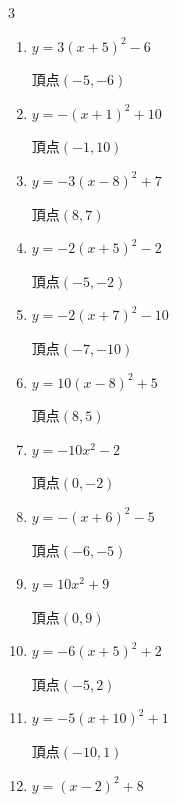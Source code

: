 \begin{multicols}{3}
\begin{enumerate}
        $\displaystyle 頂点\left( 5 , -3 \right)$

  \item $\displaystyle y=3\left( x+5\right)^{2}-6$

        $\displaystyle 頂点\left( -5 , -6 \right)$

  \item $\displaystyle y=-\left( x+1\right)^{2}+10$

        $\displaystyle 頂点\left( -1 , 10 \right)$

  \item $\displaystyle y=-3\left( x-8\right)^{2}+7$

        $\displaystyle 頂点\left( 8 , 7 \right)$

  \item $\displaystyle y=-2\left( x+5\right)^{2}-2$

        $\displaystyle 頂点\left( -5 , -2 \right)$

  \item $\displaystyle y=-2\left( x+7\right)^{2}-10$

        $\displaystyle 頂点\left( -7 , -10 \right)$

  \item $\displaystyle y=10\left( x-8\right)^{2}+5$

        $\displaystyle 頂点\left( 8 , 5 \right)$

  \item $\displaystyle y=-10x^{2}-2$

        $\displaystyle 頂点\left( 0 , -2 \right)$

  \item $\displaystyle y=-\left( x+6\right)^{2}-5$

        $\displaystyle 頂点\left( -6 , -5 \right)$

  \item $\displaystyle y=10x^{2}+9$

        $\displaystyle 頂点\left( 0 , 9 \right)$

  \item $\displaystyle y=-6\left( x+5\right)^{2}+2$

        $\displaystyle 頂点\left( -5 , 2 \right)$

  \item $\displaystyle y=-5\left( x+10\right)^{2}+1$

        $\displaystyle 頂点\left( -10 , 1 \right)$

  \item $\displaystyle y=\left( x-2\right)^{2}+8$


\end{enumerate}
\end{multicols}
